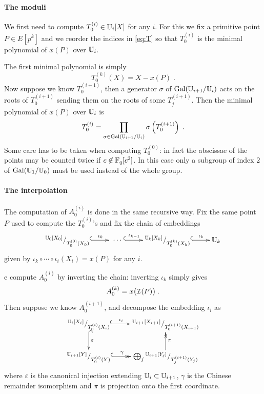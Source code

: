 \paragraph{The moduli}
We first need to compute $T_0^{(i)}\in\mathbb{U}_i[X]$ for any $i$. For this
we fix a primitive point $P\in E[p^k]$ and we reorder the indices in
\eqref{eq:T} so that $T_0^{(i)}$ is the minimal polynomial of $x(P)$
over $\mathbb{U}_i$.

The first minimal polynomial is simply
\begin{equation}
  \label{eq:T_0^k}
  T_0^{(k)}(X) = X - x(P)
  \;\text{.}
\end{equation}
Now suppose we know $T_0^{(i+1)}$, then a generator $\sigma$ of
$\operatorname{Gal}(\mathbb{U}_{i+1}/\mathbb{U}_i)$ acts on the roots of $T_0^{(i+1)}$ sending them
on the roots of some $T_j^{(i+1)}$. Then the
minimal polynomial of $x(P)$ over $\mathbb{U}_i$ is
\begin{equation}
  \label{eq:T_0^i}
  T_0^{(i)} = \prod_{\sigma\in\operatorname{Gal}(\mathbb{U}_{i+1}/\mathbb{U}_i)} \sigma\left(T_0^{(i+1)}\right)
  \;\text{.}
\end{equation}
Some care has to be taken when computing $T_0^{(0)}$: in fact the
abscissae of the points may be counted twice if
$c\not\in\mathbb{F}_q[c^2]$. In this case only a subgroup of index $2$ of
$\operatorname{Gal}(\mathbb{U}_1/\mathbb{U}_0)$ must be used instead of the whole group.


\paragraph{The interpolation}
The computation of $A_0^{(i)}$ is done in the same recursive way. Fix
the same point $P$ used to compute the $T_0^{(i)}$'s and fix the chain
of embeddings
\begin{equation}
  \xymatrix{
    ^{\U_0[X_0]}/_{T_0^{(0)}(X_0)} \ar@{^{(}->}[r]^-{\iota_0} &
    \;\cdots\; \ar@{^{(}->}[r]^-{\iota_{k-1}} &
    ^{\U_k[X_k]}/_{T_0^{(k)}(X_k)} \ar@{^{(}->}[r]^-{\iota_k} &
    \U_k
  }
\end{equation}
given by $\iota_k\circ\cdots\circ\iota_i(X_i) = x(P)$ for any $i$.

e compute $A_0^{(i)}$ by inverting the chain: inverting $\iota_k$
simply gives
\begin{equation}
  \label{eq:A_0^k}
  A_0^{(k)} = x\bigl(\mathcal{I}(P)\bigr)
  \;\text{.}
\end{equation}
Then suppose we know $A_0^{(i+1)}$, and decompose the embedding
$\iota_i$ as
\begin{equation}
  \xymatrix{
    ^{\U_i[X_i]}/_{T_0^{(i)}(X_i)} \ar@{^{(}->}[r]^-{\iota_i} \ar@{^{(}->}[d]^{\varepsilon} &
    ^{\U_{i+1}[X_{i+1}]}/_{T_0^{(i+1)}(X_{i+1})} \\
    ^{\U_{i+1}[Y]}/_{T_0^{(i)}(Y)} \ar@{^{(}->>}[r]^-{\gamma} &
    \bigoplus_j {}^{\U_{i+1}[Y_{j}]}/_{T_j^{(i+1)}(Y_{j})} \ar@{->>}[u]_{\pi}
  }
\end{equation}
where $\varepsilon$ is the canonical injection extending
$\mathbb{U}_i\subset\mathbb{U}_{i+1}$, $\gamma$ is the Chinese remainder isomorphism
and $\pi$ is projection onto the first coordinate.

